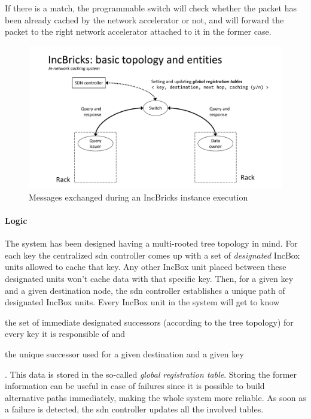 If there is a match, the programmable switch will check whether the packet has been already cached by the network accelerator or not, and will forward the packet to the right network accelerator attached to it in the former case.

\begin{figure}[!htb]
    \centering
        \includegraphics[page=4, clip, trim=4.1cm 0.1cm 4.3cm 0.1cm, width=1.00\textwidth]{figures/analysis/inp/presentation.pdf}
    \caption{Messages exchanged during an IncBricks \texorpdfstring{\cite{incbricks}}{} instance execution}
\end{figure}

\paragraph{Logic}
The system has been designed having a multi-rooted tree topology in mind.
For each key the centralized \gls{sdn} controller comes up with a set of \textit{designated} IncBox units allowed to cache that key.
Any other IncBox unit placed between these designated units won't cache data with that specific key.
Then, for a given key and a given destination node, the \gls{sdn} controller establishes a unique path of designated IncBox units.
Every IncBox unit in the system will get to know
\begin{mylist}
    \item the set of immediate designated successors (according to the tree topology) for every key it is responsible of and
    \item the unique successor used for a given destination and a given key
\end{mylist}.
This data is stored in the so-called \textit{global registration table}.
Storing the former information can be useful in case of failures since it is possible to build alternative paths immediately, making the whole system more reliable.
As soon as a failure is detected, the \gls{sdn} controller updates all the involved tables.

